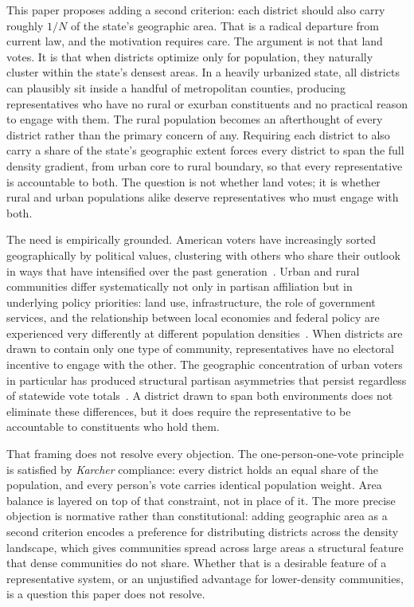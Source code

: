 This paper proposes adding a second criterion: each district should
also carry roughly $1/N$ of the state's geographic area. That is a
radical departure from current law, and the motivation requires care.
The argument is not that land votes. It is that when districts
optimize only for population, they naturally cluster within the
state's densest areas. In a heavily urbanized state, all districts
can plausibly sit inside a handful of metropolitan counties, producing
representatives who have no rural or exurban constituents and no
practical reason to engage with them. The rural population becomes
an afterthought of every district rather than the primary concern of
any. Requiring each district to also carry a share of the state's
geographic extent forces every district to span the full density
gradient, from urban core to rural boundary, so that every
representative is accountable to both. The question is not whether
land votes; it is whether rural and urban populations alike deserve
representatives who must engage with both.

The need is empirically grounded. American voters have increasingly
sorted geographically by political values, clustering with others
who share their outlook in ways that have intensified over the past
generation~\cite{bishop2008}. Urban and rural communities differ
systematically not only in partisan affiliation but in underlying
policy priorities: land use, infrastructure, the role of government
services, and the relationship between local economies and federal
policy are experienced very differently at different population
densities~\cite{rodden2019}. When districts are drawn to contain
only one type of community, representatives have no electoral
incentive to engage with the other. The geographic concentration of
urban voters in particular has produced structural partisan
asymmetries that persist regardless of statewide vote
totals~\cite{chenrodden2013}. A district drawn to span both
environments does not eliminate these differences, but it does
require the representative to be accountable to constituents who
hold them.

That framing does not resolve every objection. The one-person-one-vote
principle is satisfied by \textit{Karcher} compliance: every district
holds an equal share of the population, and every person's vote
carries identical population weight. Area balance is layered on top
of that constraint, not in place of it. The more precise objection
is normative rather than constitutional: adding geographic area as a
second criterion encodes a preference for distributing districts
across the density landscape, which gives communities spread across
large areas a structural feature that dense communities do not share.
Whether that is a desirable feature of a representative system, or
an unjustified advantage for lower-density communities, is a
question this paper does not resolve.


